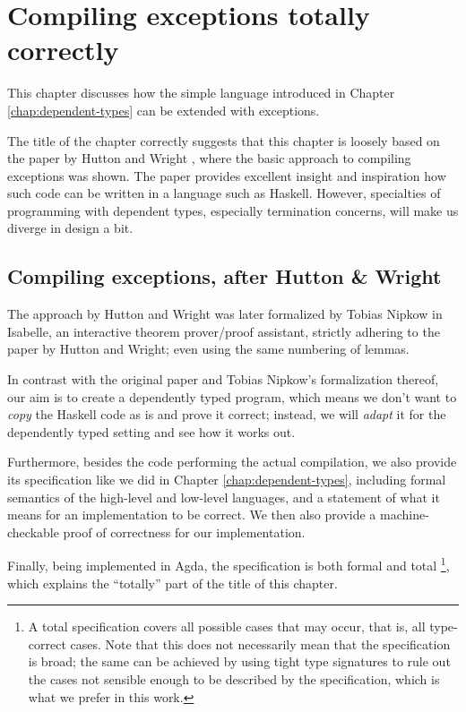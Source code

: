 \chapter{Compiling exceptions totally correctly}
\label{chap:execution}

This chapter discusses how the simple language introduced in Chapter \ref{chap:dependent-types}
can be extended with exceptions.

The title of the chapter correctly suggests that this chapter is loosely based on the paper by
Hutton and Wright \cite{gmh:exceptions}, where the basic approach to compiling exceptions
was shown.
The paper provides excellent insight and inspiration how such code can be written
in a language such as Haskell. However, specialties of programming with dependent types,
especially termination concerns, will make us diverge in design a bit.

\section{Compiling exceptions, after Hutton \& Wright}

The approach by Hutton and Wright was
later formalized by Tobias Nipkow \cite{nipkow} in Isabelle, an interactive
theorem prover/proof assistant, strictly adhering to the paper by Hutton and Wright;
even using the same numbering of lemmas.

In contrast with the original paper and Tobias Nipkow's formalization thereof,
our aim is to create a dependently typed program, which means we don't want to
\emph{copy} the Haskell code as is and prove it correct; instead, we will
\emph{adapt} it for the dependently typed setting and see how it works out.

Furthermore, besides the code performing the actual compilation, we also
provide its specification like we did in Chapter \ref{chap:dependent-types},
including formal semantics of the high-level and low-level languages, and a statement of what
it means for an implementation to be correct. We then also provide a machine-checkable proof
of correctness for our implementation.

Finally, being implemented in Agda, the specification is both formal and total%
\footnote{A total specification covers all possible cases that may occur, that is,
all type-correct cases. Note that this does not necessarily mean that the specification
is broad; the same can be achieved by using tight type signatures to rule out the cases
not sensible enough to be described by the specification, which is what
we prefer in this work.}, which explains the
``totally'' part of the title of this chapter.

